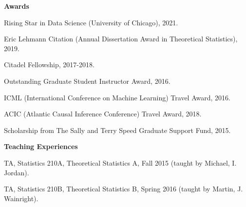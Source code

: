 \documentclass{article}
\begin{document}
\vspace{5mm}
\begin{large}
\noindent \textbf{Awards}
\end{large}

\vspace{5mm}

Rising Star in Data Science (University of Chicago), 2021.

\vspace{2mm}

Eric Lehmann Citation (Annual Dissertation Award in Theoretical Statistics), 2019.

\vspace{2mm}

Citadel Fellowship, 2017-2018.

\vspace{2mm}

Outstanding Graduate Student Instructor Award, 2016.

\vspace{2mm}
ICML (International Conference on Machine Learning) Travel Award, 2016.

\vspace{2mm}
ACIC (Atlantic Causal Inference Conference) Travel Award, 2018.

\vspace{2mm}
Scholarship from The Sally and Terry Speed Graduate Support Fund, 2015.

\vspace{5mm}
\begin{large}
\noindent \textbf{Teaching Experiences}
\end{large}
\vspace{5mm}

TA, Statistics 210A, Theoretical Statistics A, Fall 2015 (taught by Michael, I. Jordan). 



\vspace{2mm}
TA, Statistics 210B, Theoretical Statistics B, Spring 2016 (taught by Martin, J. Wainright). 


\end{document}
